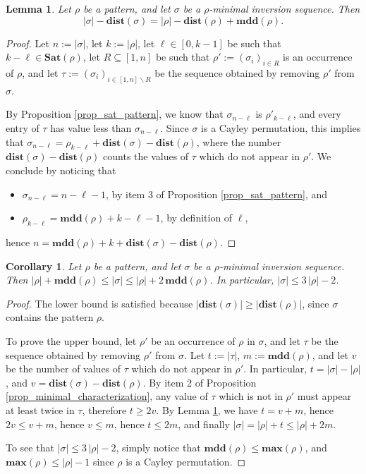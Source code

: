 \documentclass[a4paper,11pt]{article}
\newtheorem{lem}[thm]{Lemma}
\newtheorem{corol}[thm]{Corollary}
\theoremstyle{definition}
\theoremstyle{remark}
\renewcommand{\max}{\mathbf{max}}
\newcommand{\mdd}{\mathbf{mdd}}
\newcommand{\Sat}{\mathbf{Sat}}
\newcommand{\dist}{\mathbf{dist}}
\begin{document}
\begin{lem} \label{lem_len-dist-mdd}
    Let $\rho$ be a pattern, and let $\sigma$ be a $\rho$-minimal inversion sequence. Then $$|\sigma| - \dist(\sigma) = |\rho| - \dist(\rho) + \mdd(\rho).$$
\end{lem}
\begin{proof}
    Let $n := |\sigma|$, let $k := |\rho|$, let $\ell \in [0,k-1]$ be such that $k-\ell \in \Sat(\rho)$, let $R \subseteq [1,n]$ be such that $\rho' := (\sigma_{i})_{i \in R}$ is an occurrence of $\rho$, and let $\tau := (\sigma_i)_{i \in [1,n] \backslash R}$ be the sequence obtained by removing $\rho'$ from $\sigma$.

    By Proposition \ref{prop_sat_pattern}, we know that $\sigma_{n-\ell}$ is $\rho'_{k-\ell}$, and every entry of $\tau$ has value less than $\sigma_{n-\ell}$. Since $\sigma$ is a Cayley permutation, this implies that ${\sigma_{n-\ell} = \rho_{k-\ell} + \dist(\sigma) - \dist(\rho)}$, where the number $\dist(\sigma) - \dist(\rho)$ counts the values of $\tau$ which do not appear in $\rho'$. We conclude by noticing that
    \begin{itemize}
        \item $\sigma_{n-\ell} = n - \ell - 1$, by item 3 of Proposition \ref{prop_sat_pattern}, and
        \item $\rho_{k-\ell} = \mdd(\rho) + k-\ell - 1$, by definition of $\ell$,
    \end{itemize}
    hence $n = \mdd(\rho) + k + \dist(\sigma) - \dist(\rho)$.
\end{proof}

\begin{corol} \label{corol_length}
    Let $\rho$ be a pattern, and let $\sigma$ be a $\rho$-minimal inversion sequence. Then $|\rho| + \mdd(\rho) \leq |\sigma| \leq |\rho| + 2 \, \mdd(\rho)$. In particular, $|\sigma| \leq 3\,|\rho| - 2$.
\end{corol}
\begin{proof}
    The lower bound is satisfied because $|\dist(\sigma)| \geq |\dist(\rho)|$, since $\sigma$ contains the pattern $\rho$.

    To prove the upper bound, let $\rho'$ be an occurrence of $\rho$ in $\sigma$, and let $\tau$ be the sequence obtained by removing $\rho'$ from $\sigma$. Let $t := |\tau|$, $m := \mdd(\rho)$, and let $v$ be the number of values of $\tau$ which do not appear in $\rho'$. In particular, $t = |\sigma| - |\rho|$, and $v = \dist(\sigma) - \dist(\rho)$. By item 2 of Proposition \ref{prop_minimal_characterization}, any value of $\tau$ which is not in $\rho'$ must appear at least twice in $\tau$, therefore $t \geq 2v$. By Lemma \ref{lem_len-dist-mdd}, we have $t = v + m$, hence $2v \leq v + m$, hence $v \leq m$, hence $t \leq 2m$, and finally $|\sigma| = |\rho| + t \leq |\rho| + 2m$.

    To see that $|\sigma| \leq 3\,|\rho| - 2$, simply notice that $\mdd(\rho) \leq \max(\rho)$, and $\max(\rho) \leq |\rho|-1$ since $\rho$ is a Cayley permutation.
\end{proof}
\end{document}
